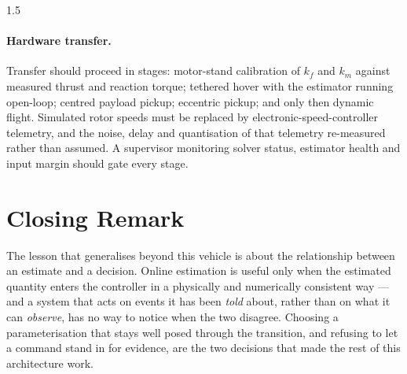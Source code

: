 \begin{spacing}{1.5}
\paragraph{Hardware transfer.} Transfer should proceed in stages: motor-stand
calibration of $k_f$ and $k_m$ against measured thrust and reaction torque;
tethered hover with the estimator running open-loop; centred payload pickup;
eccentric pickup; and only then dynamic flight. Simulated rotor speeds must be
replaced by electronic-speed-controller telemetry, and the noise, delay and
quantisation of that telemetry re-measured rather than assumed. A supervisor
monitoring solver status, estimator health and input margin should gate every
stage.

\section{Closing Remark}

The lesson that generalises beyond this vehicle is about the relationship between
an estimate and a decision. Online estimation is useful only when the estimated
quantity enters the controller in a physically and numerically consistent way ---
and a system that acts on events it has been \emph{told} about, rather than on
what it can \emph{observe}, has no way to notice when the two disagree. Choosing
a parameterisation that stays well posed through the transition, and refusing to
let a command stand in for evidence, are the two decisions that made the rest of
this architecture work.

\end{spacing}
\newpage
